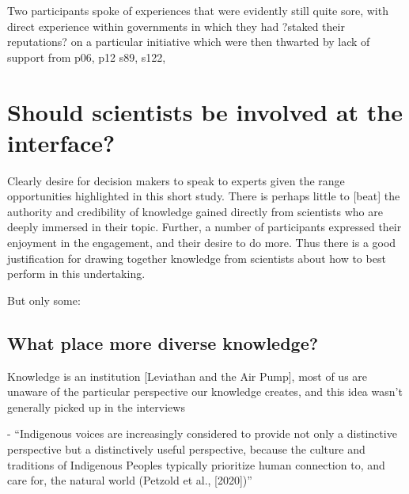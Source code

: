 Two participants spoke of experiences that were evidently still quite sore, with direct experience within governments in which they had ?staked their reputations? on a particular initiative which were then thwarted by lack of support from p06, p12 s89, s122, 

\section{Should scientists be involved at the interface?}
Clearly desire for decision makers to speak to experts given the range opportunities highlighted in this short study. There is perhaps little to [beat] the  authority and credibility of knowledge gained directly from scientists who are deeply immersed in their topic. Further, a number of participants expressed their enjoyment in the engagement, and their desire to do more. Thus there is a good justification for drawing together knowledge from scientists about how to best perform in this undertaking.

But only some: 




\subsection{What place more diverse knowledge?}

Knowledge is an institution [Leviathan and the Air Pump], most of us are unaware of the particular perspective our knowledge creates, and this idea wasn't generally picked up in the interviews

\cite{Clayton2024} - ``Indigenous voices are increasingly considered to provide not only a distinctive perspective but a distinctively useful perspective, because the culture and traditions of Indigenous Peoples typically prioritize human connection to, and care for, the natural world (Petzold et al., [2020])''

